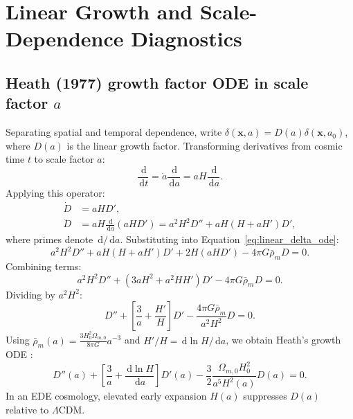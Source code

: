 \documentclass[11pt]{article}
\newcommand{\dd}{\,\mathrm d}
\begin{document}
\section{Linear Growth and Scale-Dependence Diagnostics}
\label{sec:growth}

\subsection{Heath (1977) growth factor ODE in scale factor \texorpdfstring{$a$}{a}}
Separating spatial and temporal dependence, write $\delta(\bm x, a) = D(a)\delta(\bm x, a_0)$, where $D(a)$ is the linear growth factor. Transforming derivatives from cosmic time $t$ to scale factor $a$:
\begin{equation}
\frac{\dd}{\dd t} = \dot a \frac{\dd}{\dd a} = aH \frac{\dd}{\dd a}.
\end{equation}
Applying this operator:
\begin{align}
\dot D &= aH D',\\
\ddot D &= aH \frac{\dd}{\dd a}(aH D') = a^2H^2 D'' + aH\left(H + aH'\right)D',
\end{align}
where primes denote $\dd/\dd a$. Substituting into Equation~\eqref{eq:linear_delta_ode}:
\begin{equation}
a^2H^2 D'' + aH(H + aH')D' + 2H(aH D') - 4\pi G \bar\rho_m D = 0.
\end{equation}
Combining terms:
\begin{equation}
a^2H^2 D'' + \left( 3aH^2 + a^2H H' \right)D' - 4\pi G \bar\rho_m D = 0.
\end{equation}
Dividing by $a^2H^2$:
\begin{equation}
D'' + \left[ \frac{3}{a} + \frac{H'}{H} \right]D' - \frac{4\pi G \bar\rho_m}{a^2H^2}D = 0.
\end{equation}
Using $\bar\rho_m(a) = \frac{3H_0^2\Omega_{m,0}}{8\pi G}a^{-3}$ and $H'/H = \dd\ln H/\dd a$, we obtain Heath's growth ODE \cite{heath1977growth}:
\begin{equation}
\boxed{D''(a) + \left[ \frac{3}{a} + \frac{\dd\ln H}{\dd a} \right]D'(a) - \frac{3}{2}\frac{\Omega_{m,0}H_0^2}{a^5 H^2(a)}D(a) = 0}.
\label{eq:growth_ode}
\end{equation}
In an EDE cosmology, elevated early expansion $H(a)$ suppresses $D(a)$ relative to $\Lambda\mathrm{CDM}$.
\end{document}
